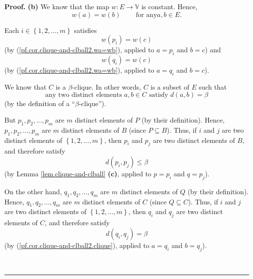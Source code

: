 \documentclass[numbers=enddot,12pt,final,onecolumn,notitlepage]{scrartcl}%
\theoremstyle{definition}
\newenvironment{proof}[1][Proof]{\noindent\textbf{#1.} }{\ \rule{0.5em}{0.5em}}
\renewcommand{\leq}{\leqslant}
\theoremstyle{plainsl}
\begin{document}
\begin{proof}
\textbf{(b)} We know that the map $w:E\rightarrow\mathbb{V}$ is constant.
Hence,
\begin{equation}
w\left(  a\right)  =w\left(  b\right)  \ \ \ \ \ \ \ \ \ \ \text{for any
}a,b\in E. \label{pf.cor.clique-and-clball2.wa=wb}%
\end{equation}


Each $i\in\left\{  1,2,\ldots,m\right\}  $ satisfies%
\begin{equation}
w\left(  p_{i}\right)  =w\left(  c\right)
\label{pf.cor.clique-and-clball2.wp=wc}%
\end{equation}
(by (\ref{pf.cor.clique-and-clball2.wa=wb}), applied to $a=p_{i}$ and $b=c$)
and%
\begin{equation}
w\left(  q_{i}\right)  =w\left(  c\right)
\label{pf.cor.clique-and-clball2.wq=wc}%
\end{equation}
(by (\ref{pf.cor.clique-and-clball2.wa=wb}), applied to $a=q_{i}$ and $b=c$).

We know that $C$ is a $\beta$-clique. In other words, $C$ is a subset of $E$
such that%
\begin{equation}
\text{any two distinct elements }a,b\in C\text{ satisfy }d\left(  a,b\right)
=\beta\label{pf.cor.clique-and-clball2.clique}%
\end{equation}
(by the definition of a \textquotedblleft$\beta$-clique\textquotedblright).

But $p_{1},p_{2},\ldots,p_{m}$ are $m$ distinct elements of $P$ (by their
definition). Hence, $p_{1},p_{2},\ldots,p_{m}$ are $m$ distinct elements of
$B$ (since $P\subseteq B$). Thus, if $i$ and $j$ are two distinct elements of
$\left\{  1,2,\ldots,m\right\}  $, then $p_{i}$ and $p_{j}$ are two distinct
elements of $B$, and therefore satisfy%
\begin{equation}
d\left(  p_{i},p_{j}\right)  \leq\beta\label{pf.cor.clique-and-clball2.dp}%
\end{equation}
(by Lemma \ref{lem.clique-and-clball} \textbf{(c)}, applied to $p=p_{i}$ and
$q=p_{j}$).

On the other hand, $q_{1},q_{2},\ldots,q_{m}$ are $m$ distinct elements of $Q$
(by their definition). Hence, $q_{1},q_{2},\ldots,q_{m}$ are $m$ distinct
elements of $C$ (since $Q\subseteq C$). Thus, if $i$ and $j$ are two distinct
elements of $\left\{  1,2,\ldots,m\right\}  $, then $q_{i}$ and $q_{j}$ are
two distinct elements of $C$, and therefore satisfy%
\begin{equation}
d\left(  q_{i},q_{j}\right)  =\beta\label{pf.cor.clique-and-clball2.dq}%
\end{equation}
(by (\ref{pf.cor.clique-and-clball2.clique}), applied to $a=q_{i}$ and
$b=q_{j}$).


\end{proof}
\end{document}
